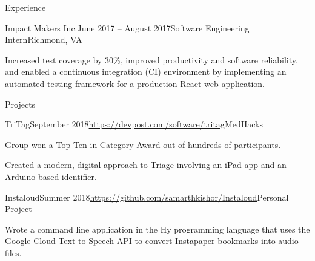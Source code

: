 \documentclass{resume}
\begin{document}
\begin{rSection}{Experience}

  \begin{rSubsection}{Impact Makers Inc.}{June 2017 -- August 2017}{Software Engineering Intern}{Richmond, VA}
    \item Increased test coverage by 30\%, improved productivity and software reliability, and enabled a continuous integration (CI) environment by implementing an automated testing framework for a production React web application.
  \end{rSubsection}

\end{rSection}

\begin{rSection}{Projects}

  \begin{rSubsection}{TriTag}{September 2018}{\url{https://devpost.com/software/tritag}}{MedHacks}
    \item Group won a Top Ten in Category Award out of hundreds of participants.
    \item Created a modern, digital approach to Triage involving an iPad app and an Arduino-based identifier.
  \end{rSubsection}

  \begin{rSubsection}{Instaloud}{Summer 2018}{\url{https://github.com/samarthkishor/Instaloud}}{Personal Project}
    \item Wrote a command line application in the Hy programming language that uses the Google Cloud Text to Speech API to convert Instapaper bookmarks into audio files.
  \end{rSubsection}

\end{rSection}
\end{document}
